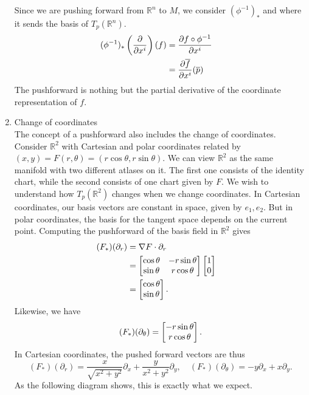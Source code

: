 \documentclass[12pt,letterpaper,boxed]{article}
\newcommand{\R}{{\mathbb{R}}}
\begin{document}
\begin{enumerate}
	Since we are pushing forward from $\R^n$ to $M$, we consider $(\phi^{-1})_*$ and where it sends the basis of $T_p(\R^n)$.
	\[
		\begin{aligned}
			(\phi^{-1})_* \left( \frac{\partial }{\partial x^i} \right)(f) &= \frac{\partial f \circ \phi^{-1} }{\partial x^i} \cr
							         			&= \frac{\partial \overline{f} }{\partial x^i}(\overline{p})
		\end{aligned}		
	\]
	The pushforward is nothing but the partial derivative of the coordinate representation of $f$.
	\item Change of coordinates \\
	The concept of a pushforward also includes the change of coordinates. Consider $\R^2$ with Cartesian and polar coordinates related by $(x, y) = F(r,\theta) = (r \cos \theta, r \sin \theta)$. We can view $\R^2$ as the same manifold with two different atlases on it. The first one consists of the  identity chart, while the second consists of one chart given by $F$. We wish to understand how $T_p(\R^2)$ changes when we change coordinates. In Cartesian coordinates, our basis vectors are constant in space, given by $e_1, e_2$. But in polar coordinates, the basis for the tangent space depends on the current point. Computing the pushforward of the basis field in $\R^2$ gives
	\[
		\begin{aligned}
			(F_*)(\partial_r) &= \nabla F \cdot \partial_r  \cr
				   &= \begin{bmatrix*}
					   \cos \theta & -r \sin \theta \cr
					   \sin \theta & r \cos \theta
				   \end{bmatrix*} 
				   \begin{bmatrix*}
					   1 \cr
					   0
				   \end{bmatrix*} \cr
				   &= \begin{bmatrix*}
					   \cos \theta \cr
					   \sin \theta
				      \end{bmatrix*}.
		\end{aligned}
	\]
	Likewise, we have
	\[
		(F_*)(\partial_\theta) = \begin{bmatrix*}
						-r \sin \theta \cr
						r \cos \theta
					\end{bmatrix*}.
	\]
	In Cartesian coordinates, the pushed forward vectors are thus
	\[
		(F_*)(\partial_r) = \frac{x}{\sqrt{x^2 + y^2}} \partial_x + \frac{y}{x^2 + y^2} \partial_y, \quad (F_*)(\partial_\theta) = -y \partial_x + x \partial_y.
	\]
	As the following diagram shows, this is exactly what we expect. 

\end{enumerate}
\end{document}
